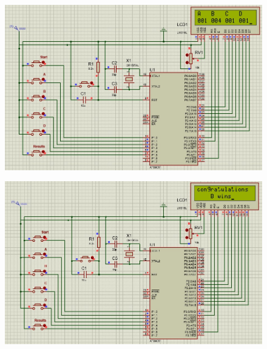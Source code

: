 \begin{figure}[H]  %
\begin{center}
\includegraphics[scale=0.50]{Chapter4/simulation7}
\end{center}
\end{figure}
\begin{figure}[H]  %
\begin{center}
\includegraphics[scale=0.50]{Chapter4/simulation8}
\end{center}
\end{figure}
